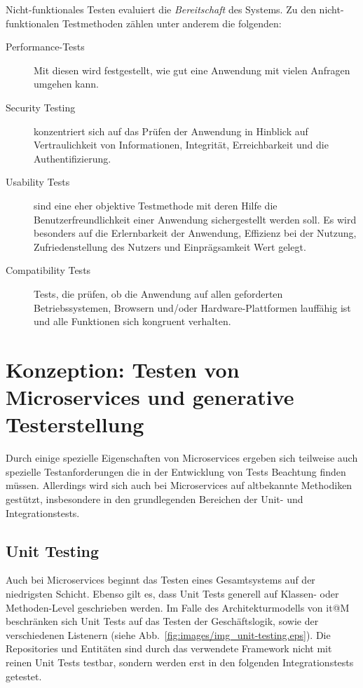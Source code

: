 \documentclass[12pt,a4paper,bibliography=totocnumbered,listof=totocnumbered]{scrartcl}
\begin{document}

Nicht-funktionales Testen evaluiert die \textit{Bereitschaft} des Systems\cite{erikssontesting}. Zu den nicht-funktionalen Testmethoden zählen unter anderem die folgenden\cite{inflectra}:

\begin{description}
	\item[Performance-Tests] Mit diesen wird festgestellt, wie gut eine Anwendung mit vielen Anfragen umgehen kann.
	\item[Security Testing] konzentriert sich auf das Prüfen der Anwendung in Hinblick auf Vertraulichkeit von Informationen, Integrität, Erreichbarkeit und die Authentifizierung.
	\item[Usability Tests] sind eine eher objektive Testmethode mit deren Hilfe die Benutzerfreundlichkeit einer Anwendung sichergestellt werden soll. Es wird besonders auf die Erlernbarkeit der Anwendung, Effizienz bei der Nutzung, Zufriedenstellung des Nutzers und Einprägsamkeit Wert gelegt.
	\item[Compatibility Tests] Tests, die prüfen, ob die Anwendung auf allen geforderten Betriebssystemen, Browsern und/oder Hardware-Plattformen lauffähig ist und alle Funktionen sich kongruent verhalten.
\end{description} 

\section{Konzeption: Testen von Microservices und generative Testerstellung}\label{ch:ms-test}
\label{sec:testingms}

Durch einige spezielle Eigenschaften von Microservices ergeben sich teilweise auch spezielle Testanforderungen die in der Entwicklung von Tests Beachtung finden müssen. Allerdings wird sich auch bei Microservices auf altbekannte Methodiken gestützt, insbesondere in den grundlegenden Bereichen der Unit- und Integrationstests.

\subsection{Unit Testing}

Auch bei Microservices beginnt das Testen eines Gesamtsystems auf der niedrigsten Schicht. Ebenso gilt es, dass Unit Tests generell auf Klassen- oder Methoden-Level geschrieben werden\cite{clemson}. Im Falle des Architekturmodells von it@M beschränken sich Unit Tests auf das Testen der Geschäftslogik, sowie der verschiedenen Listenern (siehe Abb.~\ref{fig:images/img_unit-testing.eps}). Die Repositories und Entitäten sind durch das verwendete Framework nicht mit reinen Unit Tests testbar, sondern werden erst in den folgenden Integrationstests getestet.
\end{document}
